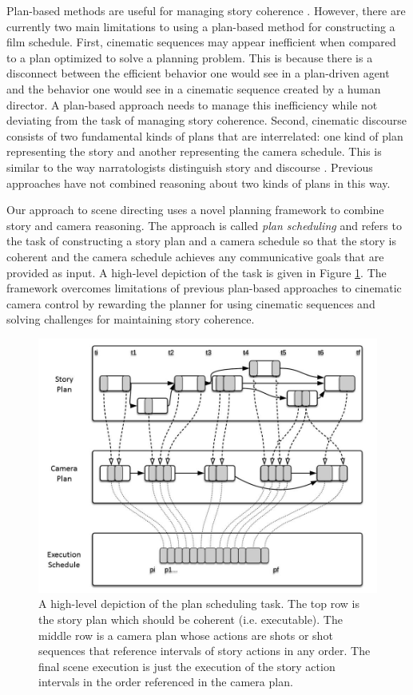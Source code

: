 \documentclass[letterpaper]{article}
\begin{document}
Plan-based methods are useful for managing story coherence \cite{riedl2010narrative,young2013plans}. However, there are currently two main limitations to using a plan-based method for constructing a film schedule. First, cinematic sequences may appear inefficient when compared to a plan optimized to solve a planning problem. This is because there is a disconnect between the efficient behavior one would see in a plan-driven agent and the behavior one would see in a cinematic sequence created by a human director. A plan-based approach needs to manage this inefficiency while not deviating from the task of managing story coherence. Second, cinematic discourse consists of two fundamental kinds of plans that are interrelated: one kind of plan representing the story and another representing the camera schedule. This is similar to the way narratologists distinguish story and discourse \cite{chatman1980story,genette1983narrative,young2007story,bordwell2013narration}. Previous approaches have not combined reasoning about two kinds of plans in this way.

Our approach to scene directing uses a novel planning framework to combine story and camera reasoning. The approach is called \textit{plan scheduling} and refers to the task of constructing a story plan and a camera schedule so that the story is coherent and the camera schedule achieves any communicative goals that are provided as input. A high-level depiction of the task is given in Figure \ref{fig:planscheduling}. The framework overcomes limitations of previous plan-based approaches to cinematic camera control by rewarding the planner for using cinematic sequences and solving challenges for maintaining story coherence. 

\begin{figure}
    \centering
    \includegraphics[scale=0.34]{PlanScheduling.jpg}
    \caption{A high-level depiction of the plan scheduling task. The top row is the story plan which should be coherent (i.e. executable). The middle row is a camera plan whose actions are shots or shot sequences that reference intervals of story actions in any order. The final scene execution is just the execution of the story action intervals in the order referenced in the camera plan.}
    \label{fig:planscheduling}
\end{figure}
\end{document}
